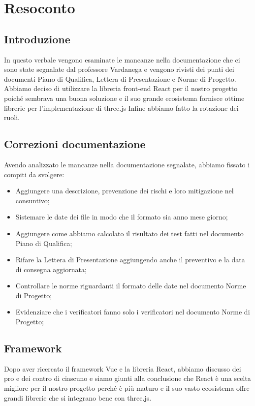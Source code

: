 \section{Resoconto}
\subsection{Introduzione}

In questo verbale vengono esaminate le mancanze nella documentazione che ci sono state segnalate dal professore Vardanega e vengono rivisti dei punti dei documenti Piano di Qualifica, Lettera di Presentazione e Norme di Progetto.
Abbiamo deciso di utilizzare la libreria front-end React per il nostro progetto poiché sembrava una buona soluzione e il suo grande ecosistema fornisce ottime librerie per l'implementazione di three.js
Infine abbiamo fatto la rotazione dei ruoli.

\subsection{Correzioni documentazione}
Avendo analizzato le mancanze nella documentazione segnalate, abbiamo fissato i compiti da svolgere:
\begin{itemize}
    \item Aggiungere una descrizione, prevenzione dei rischi e loro mitigazione nel consuntivo;
    \item Sistemare le date dei file in modo che il formato sia anno mese giorno;
    \item Aggiungere come abbiamo calcolato il risultato dei test fatti nel documento Piano di Qualifica;
    \item Rifare la Lettera di Presentazione aggiungendo anche il preventivo e la data di consegna aggiornata;
    \item Controllare le norme riguardanti il formato delle date nel documento Norme di Progetto;
    \item Evidenziare che i verificatori fanno solo i verificatori nel documento Norme di Progetto;
\end{itemize}
\subsection{Framework}
Dopo aver ricercato il framework Vue e la libreria React, abbiamo discusso dei pro e dei contro di ciascuno e siamo giunti alla conclusione che React è una scelta migliore per il nostro progetto perché è più maturo e il suo vasto ecosistema offre grandi librerie che si integrano bene con three.js.
